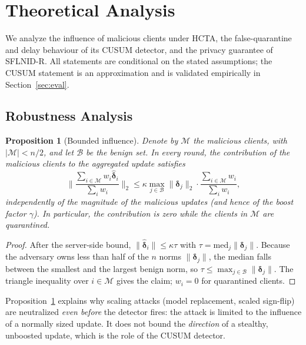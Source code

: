\documentclass[journal]{IEEEtran}
\newtheorem{proposition}{Proposition}
\begin{document}
\section{Theoretical Analysis}
We analyze the influence of malicious clients under HCTA, the false-quarantine and delay behaviour of its CUSUM detector, and the privacy guarantee of SFLNID-R. All statements are conditional on the stated assumptions; the CUSUM statement is an approximation and is validated empirically in Section~\ref{sec:eval}.

\subsection{Robustness Analysis}
\begin{proposition}[Bounded influence]\label{prop:bound}
Denote by $\mathcal{M}$ the malicious clients, with $|\mathcal{M}|<n/2$, and let $\mathcal{B}$ be the benign set. In every round, the contribution of the malicious clients to the aggregated update satisfies
\begin{equation}
\Big\|\frac{\sum_{i\in\mathcal{M}}w_i\hat{\boldsymbol{\delta}}_i}{\sum_{i}w_i}\Big\|_2\le\kappa\max_{j\in\mathcal{B}}\|\boldsymbol{\delta}_j\|_2\cdot\frac{\sum_{i\in\mathcal{M}}w_i}{\sum_iw_i},
\end{equation}
independently of the magnitude of the malicious updates (and hence of the boost factor $\gamma$). In particular, the contribution is zero while the clients in $\mathcal{M}$ are quarantined.
\end{proposition}
\begin{proof}
After the server-side bound, $\|\hat{\boldsymbol{\delta}}_i\|\le\kappa\tau$ with $\tau=\mathrm{med}_j\|\boldsymbol{\delta}_j\|$. Because the adversary owns less than half of the $n$ norms $\|\boldsymbol{\delta}_j\|$, the median falls between the smallest and the largest benign norm, so $\tau\le\max_{j\in\mathcal{B}}\|\boldsymbol{\delta}_j\|$. The triangle inequality over $i\in\mathcal{M}$ gives the claim; $w_i=0$ for quarantined clients.
\end{proof}
Proposition~\ref{prop:bound} explains why scaling attacks (model replacement, scaled sign-flip) are neutralized \emph{even before} the detector fires: the attack is limited to the influence of a normally sized update. It does not bound the \emph{direction} of a stealthy, unboosted update, which is the role of the CUSUM detector.
\end{document}
